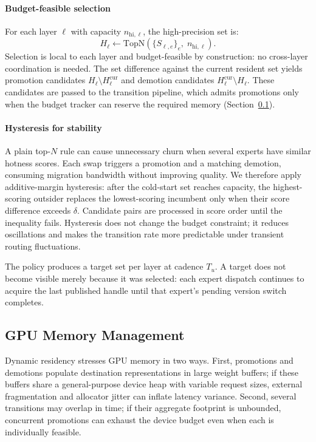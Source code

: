 \paragraph{Budget-feasible selection}
For each layer $\ell$ with capacity $n_{\mathrm{hi},\ell}$, the high-precision set is:
\[
H_\ell \leftarrow \mathrm{TopN}\!\left(\{S_{\ell,e}\}_e,\; n_{\mathrm{hi},\ell}\right).
\]
Selection is local to each layer and budget-feasible by construction: no cross-layer coordination is needed. The set difference against the current resident set yields promotion candidates $H_\ell \setminus H_\ell^{\mathrm{cur}}$ and demotion candidates $H_\ell^{\mathrm{cur}} \setminus H_\ell$. These candidates are passed to the transition pipeline, which admits promotions only when the budget tracker can reserve the required memory (Section~\ref{sec:memmgmt}).

\paragraph{Hysteresis for stability}
A plain top-$N$ rule can cause unnecessary churn when several experts have similar hotness scores. Each swap triggers a promotion and a matching demotion, consuming migration bandwidth without improving quality. We therefore apply additive-margin hysteresis: after the cold-start set reaches capacity, the highest-scoring outsider replaces the lowest-scoring incumbent only when their score difference exceeds $\delta$. Candidate pairs are processed in score order until the inequality fails. Hysteresis does not change the budget constraint; it reduces oscillations and makes the transition rate more predictable under transient routing fluctuations.

The policy produces a target set per layer at cadence $T_u$. A target does not become visible merely because it was selected: each expert dispatch continues to acquire the last published handle until that expert's pending version switch completes.

\subsection{GPU Memory Management}
\label{sec:memmgmt}

Dynamic residency stresses GPU memory in two ways. First, promotions and demotions populate destination representations in large weight buffers; if these buffers share a general-purpose device heap with variable request sizes, external fragmentation and allocator jitter can inflate latency variance. Second, several transitions may overlap in time; if their aggregate footprint is unbounded, concurrent promotions can exhaust the device budget even when each is individually feasible.

